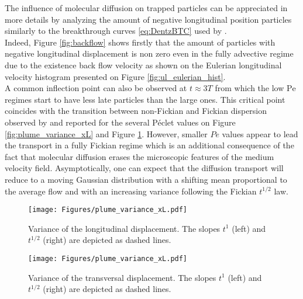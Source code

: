 The influence of molecular diffusion on trapped particles can be appreciated in more details by analyzing the amount of negative longitudinal position particles similarly to the breakthrough curves \eqref{eq:DentzBTC} used by \citet{Dentz2017}.\\ 
Indeed, Figure \ref{fig:backflow} shows firstly that the amount of particles with negative longitudinal displacement is non zero even in the fully advective regime due to the existence back flow velocity as shown on the Eulerian longitudinal velocity histogram presented on Figure \ref{fig:ul_eulerian_hist}.\\
A common inflection point can also be observed at $t\approx3T$ from which the low $\mathrm{Pe}$ regimes start to have less late particles than the large ones.
This critical point coincides with the transition between non-Fickian and Fickian dispersion observed by \citet[Fig. 2]{Meyer2016} and reported for the several Péclet values on Figure \ref{fig:plume_variance_xL} and Figure \ref{fig:plume_variance_xT}.
However, smaller $Pe$ values appear to lead the transport in a fully Fickian regime which is an additional consequence of the fact that molecular diffusion erases the microscopic features of the medium velocity field.
Asymptotically, one can expect that the diffusion transport will reduce to a moving Gaussian distribution with a shifting mean proportional to the average flow and with an increasing variance following the Fickian $t^{1/2}$ law.\\

\begin{figure}
	\centering
	\begin{minipage}{.49\textwidth}
	\centering
	\texttt{[image: Figures/plume\_variance\_xL.pdf]}
	\caption{Variance of the longitudinal displacement. The slopes $t^1$ (left) and $t^{1/2}$ (right) are depicted as dashed lines.}
	\label{fig:plume_variance_xL}
	\end{minipage}
	\begin{minipage}{.49\textwidth}
		\centering
		\texttt{[image: Figures/plume\_variance\_xL.pdf]}
		\caption{Variance of the transversal displacement. The slopes $t^1$ (left) and $t^{1/2}$ (right) are depicted as dashed lines.}
		\label{fig:plume_variance_xT}
	\end{minipage}
\end{figure}

